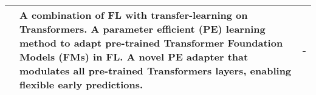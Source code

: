 \begin{changemargin}{-2cm}{0cm}
\begin{tabular}{|c||m{0.4\paperwidth}|m{0.4\paperwidth}|}
        \hline
            \cite{paper:fl_inference_anytime_anywhere}
            &
            A combination of FL with transfer-learning on Transformers.
            A parameter efficient (PE) learning method to adapt pre-trained Transformer Foundation Models (FMs) in FL.
            A novel PE adapter that modulates all pre-trained Transformers layers, enabling flexible early predictions.
            &
            -
        \\
        \hline
    \end{tabular}
    \label{table:additional_fl_research_table_2}
\end{changemargin}